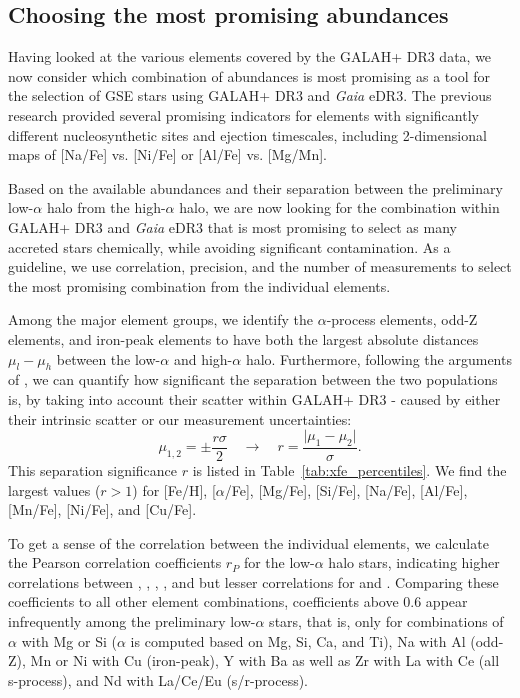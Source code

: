 \documentclass[fleqn,usenatbib]{mnras}
\newcommand{\Gaia}{\textit{Gaia}\xspace} %
\begin{document}
\subsection{Choosing the most promising abundances} \label{sec:choosing_chemical_selection}

Having looked at the various elements covered by the GALAH+ DR3 data, we now consider which combination of abundances is most promising as a tool for the selection of GSE stars using GALAH+ DR3 and \Gaia eDR3. The previous research \citep{Nissen2010, Nissen2011, Ting2012, Hawkins2015, Hayes2018} provided several promising indicators for elements with significantly different nucleosynthetic sites and ejection timescales, including 2-dimensional maps of [Na/Fe] vs. [Ni/Fe] or [Al/Fe] vs. [Mg/Mn].

Based on the available abundances and their separation between the preliminary low-$\alpha$ halo from the high-$\alpha$ halo, we are now looking for the combination within GALAH+ DR3 and \Gaia eDR3 that is most promising to select as many accreted stars chemically, while avoiding significant contamination. As a guideline, we use correlation, precision, and the number of measurements to select the most promising combination from the individual elements.

Among the major element groups, we identify the $\alpha$-process elements, odd-Z elements, and iron-peak elements to have both the largest absolute distances $\mu_l - \mu_h$ between the low-$\alpha$ and high-$\alpha$ halo. Furthermore, following the arguments of \citet{Lindegren2013}, we can quantify how significant the separation between the two populations is, by taking into account their scatter within GALAH+ DR3 - caused by either their intrinsic scatter or our measurement uncertainties: 
\begin{equation}
\mu_{1,2} = \pm \frac{r \sigma}{2} \quad \rightarrow \quad r = \frac{\vert \mu_1 - \mu_2 \vert}{\sigma}.
\end{equation}
This separation significance $r$ is listed in Table~\ref{tab:xfe_percentiles}. We find the largest values ($r > 1$) for [Fe/H], [$\alpha$/Fe], [Mg/Fe], [Si/Fe], [Na/Fe], [Al/Fe], [Mn/Fe], [Ni/Fe], and [Cu/Fe]. 

To get a sense of the correlation between the individual elements, we calculate the Pearson correlation coefficients $r_P$ for the low-$\alpha$ halo stars, indicating higher correlations between , , , , and  but lesser correlations for  and . Comparing these coefficients to all other element combinations, coefficients above 0.6 appear infrequently among the preliminary low-$\alpha$ stars, that is, only for combinations of $\alpha$ with Mg or Si ($\alpha$ is computed based on Mg, Si, Ca, and Ti), Na with Al (odd-Z), Mn or Ni with Cu (iron-peak), Y with Ba as well as Zr with La with Ce (all s-process), and Nd with La/Ce/Eu (s/r-process).
\end{document}
